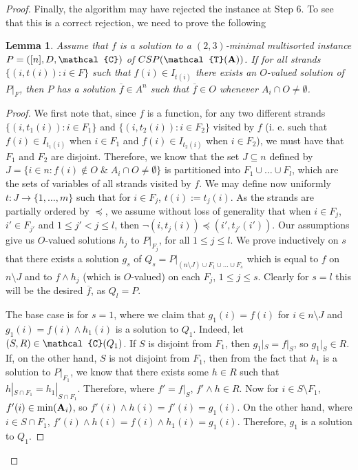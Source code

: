 \documentclass[11pt]{amsart}
\newcommand{\m}[1]{{\uppercase {\mathbf {#1}}}}
\newcommand{\vr}[1]{{\uppercase {\mathcal{#1}}}}
\newcommand{\mt}{\wedge}
\newcommand{\usub}{\subseteq}
\newtheorem{lm}[thm]{Lemma}
\theoremstyle{definition}
\begin{document}
\begin{proof}
Finally, the algorithm may have rejected the instance at Step 6. To see that this is a correct rejection, we need to prove the following

\begin{lm}\label{Malcev}
Assume that $f$ is a solution to a $(2,3)$-minimal multisorted instance $P=([n],D,\vr c)$ of $CSP(\vr t(\m a))$. If for all strands $\{(i,t(i)):i\in F\}$ such that $f(i)\in I_{t(i)}$ there exists an $O$-valued solution of $P|_F$, then $P$ has a solution $\overline{f}\in A^n$ such that $\overline{f}\in O$ whenever $A_i\cap O\neq\emptyset$.
\end{lm}

\begin{proof}
We first note that, since $f$ is a function, for any two different strands $\{(i,t_1(i)):i\in F_1\}$ and $\{(i,t_2(i)):i\in F_2\}$ visited by $f$ (i. e. such that $f(i)\in I_{t_1(i)}$ when $i\in F_1$ and $f(i)\in I_{t_2(i)}$ when $i\in F_2$), we must have that $F_1$ and $F_2$ are disjoint. Therefore, we know that the set $J\usub n$ defined by $J=\{i\in n:f(i)\notin O\;\&\;A_i\cap O\neq\emptyset\}$ is partitioned into $F_1\cup\ldots\cup F_l$, which are the sets of variables of all strands visited by $f$. We may define now uniformly $t:J\rightarrow\{1,\ldots,m\}$ such that for $i\in F_j$, $t(i):=t_j(i)$. As the strands are partially ordered by $\preceq$, we assume without loss of generality that when $i\in F_j$, $i'\in F_{j'}$ and $1\leq j'<j\leq l$, then $\neg(i,t_j(i))\preceq(i',t_{j'}(i'))$. Our assumptions give us $O$-valued solutions $h_j$ to $P|_{F_j}$, for all $1\leq j\leq l$. We prove inductively on $s$ that there exists a solution $g_s$ of $Q_s=P|_{(n\setminus J)\cup F_1\cup\ldots\cup F_s}$ which is equal to $f$ on $n\setminus J$ and to $f\mt h_j$ (which is $O$-valued) on each $F_j$, $1\leq j\leq s$. Clearly for $s=l$ this will be the desired $\overline{f}$, as $Q_l=P$.

The base case is for $s=1$, where we claim that $g_1(i)=f(i)$ for $i\in n\setminus J$ and $g_1(i)=f(i)\mt h_1(i)$ is a solution to $Q_1$. Indeed, let $(S,R)\in\vr c(Q_1)$. If $S$ is disjoint from $F_1$, then $g_1|_S=f|_S$, so $g_1|_S\in R$. If, on the other hand, $S$ is not disjoint from $F_1$, then from the fact that $h_1$ is a solution to $P|_{F_1}$, we know that there exists some $h\in R$ such that $h|_{S\cap F_1}=h_1|_{S\cap F_1}$. Therefore, where $f'=f|_S$, $f'\mt h\in R$. Now for $i\in S\setminus F_1$, $f'(i)\in\mathrm{min}(\m A_i)$, so $f'(i)\mt h(i)=f'(i)=g_1(i)$. On the other hand, where $i\in S\cap F_1$, $f'(i)\mt h(i)=f(i)\mt h_1(i)=g_1(i)$. Therefore, $g_1$ is a solution to $Q_1$.


\end{proof}
\end{proof}
\end{document}
